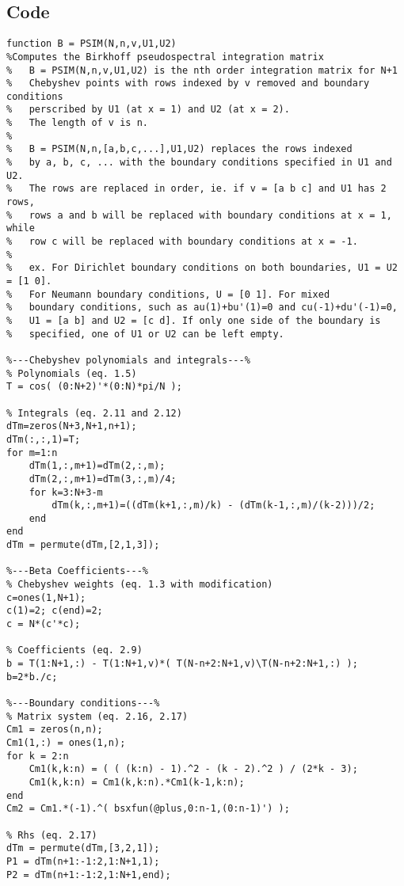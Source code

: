 \documentclass{sfuthesis}
\begin{document}
\backmatter%
	
	

\begin{appendices} %
	\chapter{Code}

\begin{verbatim}
function B = PSIM(N,n,v,U1,U2)
%Computes the Birkhoff pseudospectral integration matrix
%   B = PSIM(N,n,v,U1,U2) is the nth order integration matrix for N+1
%   Chebyshev points with rows indexed by v removed and boundary conditions
%   perscribed by U1 (at x = 1) and U2 (at x = 2).
%   The length of v is n.
%
%   B = PSIM(N,n,[a,b,c,...],U1,U2) replaces the rows indexed
%   by a, b, c, ... with the boundary conditions specified in U1 and U2.
%   The rows are replaced in order, ie. if v = [a b c] and U1 has 2 rows,
%   rows a and b will be replaced with boundary conditions at x = 1, while
%   row c will be replaced with boundary conditions at x = -1.
%
%   ex. For Dirichlet boundary conditions on both boundaries, U1 = U2 = [1 0].
%   For Neumann boundary conditions, U = [0 1]. For mixed
%   boundary conditions, such as au(1)+bu'(1)=0 and cu(-1)+du'(-1)=0,
%   U1 = [a b] and U2 = [c d]. If only one side of the boundary is
%   specified, one of U1 or U2 can be left empty.

%---Chebyshev polynomials and integrals---%
% Polynomials (eq. 1.5)
T = cos( (0:N+2)'*(0:N)*pi/N );

% Integrals (eq. 2.11 and 2.12)
dTm=zeros(N+3,N+1,n+1);
dTm(:,:,1)=T;
for m=1:n
    dTm(1,:,m+1)=dTm(2,:,m);
    dTm(2,:,m+1)=dTm(3,:,m)/4;
    for k=3:N+3-m
        dTm(k,:,m+1)=((dTm(k+1,:,m)/k) - (dTm(k-1,:,m)/(k-2)))/2;
    end
end
dTm = permute(dTm,[2,1,3]);

%---Beta Coefficients---%
% Chebyshev weights (eq. 1.3 with modification)
c=ones(1,N+1);
c(1)=2; c(end)=2;
c = N*(c'*c);

% Coefficients (eq. 2.9)
b = T(1:N+1,:) - T(1:N+1,v)*( T(N-n+2:N+1,v)\T(N-n+2:N+1,:) );
b=2*b./c;

%---Boundary conditions---%
% Matrix system (eq. 2.16, 2.17)
Cm1 = zeros(n,n);
Cm1(1,:) = ones(1,n);
for k = 2:n
    Cm1(k,k:n) = ( ( (k:n) - 1).^2 - (k - 2).^2 ) / (2*k - 3);
    Cm1(k,k:n) = Cm1(k,k:n).*Cm1(k-1,k:n);
end
Cm2 = Cm1.*(-1).^( bsxfun(@plus,0:n-1,(0:n-1)') );

% Rhs (eq. 2.17)
dTm = permute(dTm,[3,2,1]);
P1 = dTm(n+1:-1:2,1:N+1,1);
P2 = dTm(n+1:-1:2,1:N+1,end);


\end{verbatim}
\end{appendices}
\end{document}
